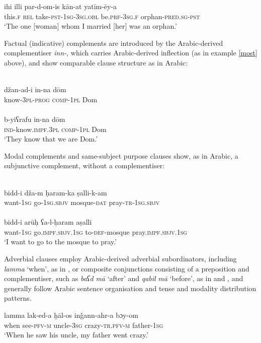 \documentclass[output=paper]{langsci/langscibook}
\begin{document}
\ea \gll   ihi illi par-d-om-is kān-at yatīm-ēy-a\\
       this.\textsc{f} \textsc{rel} take-\textsc{pst-1sg-3sg.obl} be.\textsc{prf-3sg.f} orphan-\textsc{pred.sg-pst}\\
\glt   ‘The one [woman] whom I married [her] was an orphan.’
\z

Factual (indicative) complements are introduced by the Arabic-derived complementiser \textit{inn-}, which carries Arabic-derived inflection (as in example \ref{most} above), and show comparable clause structure as in Arabic:

\ea\label{ex:matras:}
\ea
{}\\
\gll džan-ad-i in-na dōm    \\
     know-\textsc{3pl-prog} \textsc{comp}-\textsc{1pl} Dom\\
\ex
{}\\
\gll b-yiʕrafu in-na dōm  \\
     \textsc{ind}-know.\textsc{impf.3pl} \textsc{comp}-\textsc{1pl} Dom\\
\glt ‘They know that we are Dom.’
\z
\z

Modal complements and same-subject purpose clauses show, as in Arabic, a subjunctive complement, without a complementiser:

\ea\label{ex:matras:}
\ea
{}\\
\gll bidd-i  dža-m  ḥaram-ka ṣalli-k-am  \\
       want-\textsc{1sg} go-\textsc{1sg.sbjv} mosque-\textsc{dat} pray-\textsc{tr-1sg.sbjv}\\
\ex
{}\\
\gll bidd-i  arūḥ ʕa-l-ḥaram aṣalli  \\
       want-\textsc{1sg} go.\textsc{impf.sbjv.1sg} to-\textsc{def-}mosque pray.\textsc{impf.sbjv.1sg} \\
\glt    ‘I want to go to the mosque to pray.’
\z
\z

Adverbial clauses employ Arabic-derived adverbial subordinators, including \textit{lamma} ‘when’, as in , or composite conjunctions consisting of a preposition and complementiser, such as \textit{baʕd} \textit{mā} ‘after’ and \textit{qabil} \textit{mā} ‘before’, as in  and , and generally follow Arabic sentence organisation and tense and modality distribution patterns.

\ea\label{lamma} \gll lamma lak-ed-a ḫāl-os inǧann-ahr-a bɔy-om\\
       when see-\textsc{pfv-m} uncle-\textsc{3sg} crazy-\textsc{tr.pfv-m} father-\textsc{1sg}\\
\glt     ‘When he saw his uncle, my father went crazy.’
\z
\end{document}
